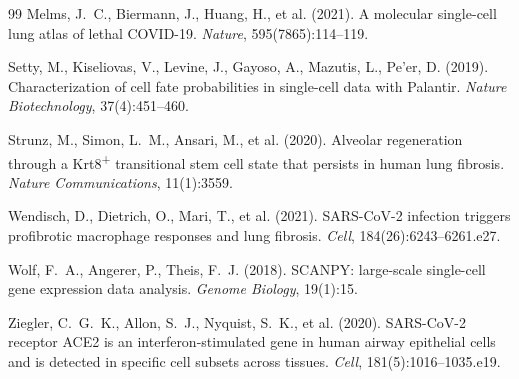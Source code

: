 \documentclass[11pt]{article}
\begin{document}
\begin{thebibliography}{99}
Melms, J.~C., Biermann, J., Huang, H., et al. (2021).
A molecular single-cell lung atlas of lethal COVID-19.
\textit{Nature}, 595(7865):114--119.

Setty, M., Kiseliovas, V., Levine, J., Gayoso, A., Mazutis, L., Pe'er, D. (2019).
Characterization of cell fate probabilities in single-cell data with Palantir.
\textit{Nature Biotechnology}, 37(4):451--460.

Strunz, M., Simon, L.~M., Ansari, M., et al. (2020).
Alveolar regeneration through a Krt8\textsuperscript{+} transitional stem cell state that persists in human lung fibrosis.
\textit{Nature Communications}, 11(1):3559.

Wendisch, D., Dietrich, O., Mari, T., et al. (2021).
SARS-CoV-2 infection triggers profibrotic macrophage responses and lung fibrosis.
\textit{Cell}, 184(26):6243--6261.e27.

Wolf, F.~A., Angerer, P., Theis, F.~J. (2018).
SCANPY: large-scale single-cell gene expression data analysis.
\textit{Genome Biology}, 19(1):15.

Ziegler, C.~G.~K., Allon, S.~J., Nyquist, S.~K., et al. (2020).
SARS-CoV-2 receptor ACE2 is an interferon-stimulated gene in human airway epithelial cells and is detected in specific cell subsets across tissues.
\textit{Cell}, 181(5):1016--1035.e19.

\end{thebibliography}
\end{document}
